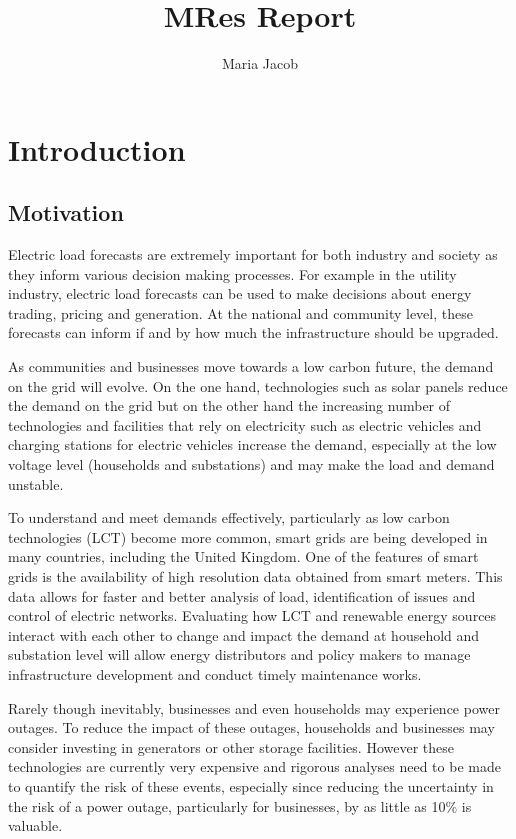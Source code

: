 \documentclass[a4paper]{article}
\title{MRes Report}
\author{Maria Jacob}
\begin{document}
\maketitle



\section{Introduction}
\subsection{Motivation}
\label{subsec:intro}
Electric load forecasts are extremely important for both industry and society as they inform various decision making processes. For example in the utility industry, electric load forecasts can be used to make decisions about energy trading, pricing and generation. At the national and community level, these forecasts can inform if and by how much the infrastructure should be upgraded.

As communities and businesses move towards a low carbon future, the demand on the grid will evolve. On the one hand, technologies such as solar panels reduce the demand on the grid but on the other hand the increasing number of technologies and facilities that rely on electricity such as electric vehicles and charging stations for electric vehicles increase the demand, especially at the low voltage level (households and substations) and may make the load and demand unstable. 

To understand and meet demands effectively, particularly as low carbon technologies (LCT) become more common, smart grids are being developed in many countries, including the United Kingdom. One of the features of smart grids is the availability of high resolution data obtained from smart meters. This data allows for faster and better analysis of load, identification of issues and control of electric networks. Evaluating how LCT and renewable energy sources interact with each other to change and impact the demand at household and substation level will allow energy distributors and policy makers to manage infrastructure development and conduct timely maintenance works.

Rarely though inevitably, businesses and even households may experience power outages. To reduce the impact of these outages, households and businesses may consider investing in generators or other storage facilities. However these technologies are currently very expensive and rigorous analyses need to be made to quantify the risk of these events, especially since reducing the uncertainty in the risk of a power outage, particularly for businesses, by as little as 10\% is valuable.
\end{document}
